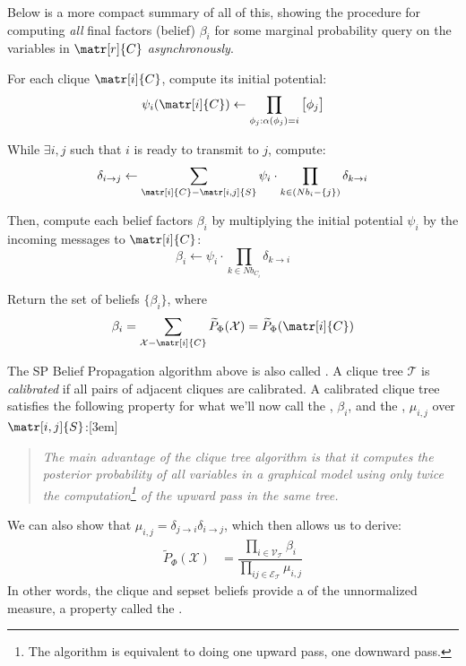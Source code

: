 \documentclass[11pt]{article}
\newcommand\p{\Needspace{10\baselineskip} \noindent}
\newcommand\tlab[1]{\tag{#1}\label{#1}}
\begin{document}
\p Below is a more compact summary of all of this, showing the procedure for computing \textit{all} final factors (belief) $\beta_i$ for some marginal probability query on the variables in $\matr[r]{C}$ \textit{asynchronously}. \\ 
\begin{compactenum}
	\item For each clique $\matr[i]{C}$, compute its initial potential:
	$$
		\psi_i(\matr[i]{C}) \leftarrow \prod_{\phi_j : \alpha(\phi_j)=i }\big[  \phi_j  \big]
	$$
	
	\item While $\exists i,j$ such that $i$ is ready to transmit to $j$, compute:
	$$
		\delta_{i \rightarrow j} \leftarrow \sum_{ \matr[i]{C} - \matr[i,j]{S}  }	\psi_i \cdot \prod_{k \in ( Nb_i - \{j\}   )} \delta_{k \rightarrow i}
	$$
	
	\item Then, compute each belief factors $\beta_i$ by multiplying the initial potential $\psi_i$ by the incoming messages to $\matr[i]{C}$:
	$$
		\beta_i \leftarrow \psi_i \cdot \prod_{k \in Nb_{C_i}} \delta_{k \rightarrow i}
	$$
	
	\item Return the set of beliefs $\{ \beta_i \}$, where 
	\begin{align}
		\beta_i = \sum_{\mathcal{X} - \matr[i]{C}} \widetilde{P}_{\Phi}(\mathcal{X}) =  \widetilde{P}_{\Phi}(\matr[i]{C})
	\end{align}
\end{compactenum}
The SP Belief Propagation algorithm above is also called . A clique tree $\mathcal{T}$ is \textit{calibrated} if all pairs of adjacent cliques are calibrated. A calibrated clique tree satisfies the following property for what we'll now call the , $\beta_i$, and the , $\mu_{i,j}$ over $\matr[i,j]{S}$:[3em]
\vspace{-0.5em}
\begin{quote}
	{\itshape\small
	The main advantage of the clique tree algorithm is that it computes the posterior probability of all variables in a graphical model using only twice the computation\footnote{The algorithm is equivalent to doing one upward pass, one downward pass.} of the upward pass in the same tree. 
	}
\end{quote}
We can also show that $\mu_{i,j} = \delta_{j \rightarrow i} \delta_{i \rightarrow j}$, which then allows us to derive:
\begin{align}
	\widetilde{P}_{\Phi}(\mathcal X) &= \dfrac{ \prod_{i \in \mathcal{V}_{\mathcal T}} \beta_i
		}{  \prod_{ij \in \mathcal{E}_{\mathcal T}} \mu_{i,j}  } 
	\tlab{10.10}
\end{align}
In other words, the clique and sepset beliefs provide a  of the unnormalized measure, a property called the .
\end{document}
